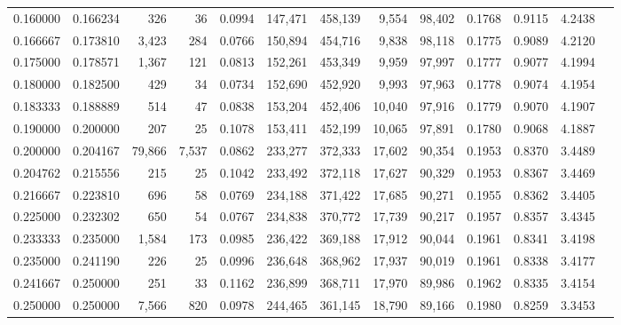 \begin{tabular}{rrrrrrrrrrrrr}
0.160000 & 0.166234 &    326 &     36 &                                     0.0994 & 147,471 & 458,139 &   9,554 &  98,402 & 0.1768 & 0.9115 & 4.2438 \\
0.166667 & 0.173810 &  3,423 &    284 &                                     0.0766 & 150,894 & 454,716 &   9,838 &  98,118 & 0.1775 & 0.9089 & 4.2120 \\
0.175000 & 0.178571 &  1,367 &    121 &                                     0.0813 & 152,261 & 453,349 &   9,959 &  97,997 & 0.1777 & 0.9077 & 4.1994 \\
0.180000 & 0.182500 &    429 &     34 &                                     0.0734 & 152,690 & 452,920 &   9,993 &  97,963 & 0.1778 & 0.9074 & 4.1954 \\
0.183333 & 0.188889 &    514 &     47 &                                     0.0838 & 153,204 & 452,406 &  10,040 &  97,916 & 0.1779 & 0.9070 & 4.1907 \\
0.190000 & 0.200000 &    207 &     25 &                                     0.1078 & 153,411 & 452,199 &  10,065 &  97,891 & 0.1780 & 0.9068 & 4.1887 \\
0.200000 & 0.204167 & 79,866 &  7,537 &                                     0.0862 & 233,277 & 372,333 &  17,602 &  90,354 & 0.1953 & 0.8370 & 3.4489 \\
0.204762 & 0.215556 &    215 &     25 &                                     0.1042 & 233,492 & 372,118 &  17,627 &  90,329 & 0.1953 & 0.8367 & 3.4469 \\
0.216667 & 0.223810 &    696 &     58 &                                     0.0769 & 234,188 & 371,422 &  17,685 &  90,271 & 0.1955 & 0.8362 & 3.4405 \\
0.225000 & 0.232302 &    650 &     54 &                                     0.0767 & 234,838 & 370,772 &  17,739 &  90,217 & 0.1957 & 0.8357 & 3.4345 \\
0.233333 & 0.235000 &  1,584 &    173 &                                     0.0985 & 236,422 & 369,188 &  17,912 &  90,044 & 0.1961 & 0.8341 & 3.4198 \\
0.235000 & 0.241190 &    226 &     25 &                                     0.0996 & 236,648 & 368,962 &  17,937 &  90,019 & 0.1961 & 0.8338 & 3.4177 \\
0.241667 & 0.250000 &    251 &     33 &                                     0.1162 & 236,899 & 368,711 &  17,970 &  89,986 & 0.1962 & 0.8335 & 3.4154 \\
0.250000 & 0.250000 &  7,566 &    820 &                                     0.0978 & 244,465 & 361,145 &  18,790 &  89,166 & 0.1980 & 0.8259 & 3.3453 \\

\end{tabular}
